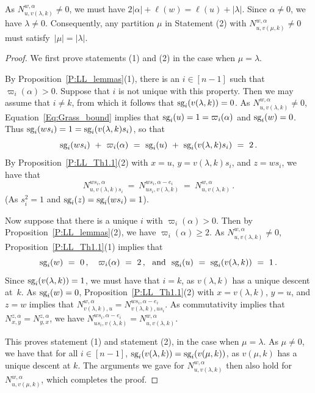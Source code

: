\documentclass[11pt]{article}
\theoremstyle{definition}
\numberwithin{equation}{section}
\newcommand{\sg}{{\mbox{\rm sg}}}
\begin{document}
As $N^{w,\alpha}_{u,v(\lambda,k)}\neq 0$, we must have $2|\alpha|+\ell(w)=\ell(u)+|\lambda|$.
Since $\alpha\neq 0$, we have $\lambda\neq 0$.
   Consequently, any partition $\mu$ in Statement (2) with $N^{w,\alpha}_{u,v(\mu,k)}\neq 0$ must satisfy~$|\mu|=|\lambda|$.

 \begin{proof}
   We first prove statements (1) and (2) in the case when $\mu=\lambda$.
   
   
   By Proposition~\ref{P:LL_lemmas}(1), there is an $i\in[n{-}1]$ such that $\varpi_i(\alpha)>0$.
   Suppose that $i$ is not unique with this property.
   Then we may assume that $i\neq k$, from which it follows that $\sg_i(v(\lambda, k)) = 0$.
   As $N^{w,\alpha}_{u,v(\lambda,k)}\neq 0$, Equation~\eqref{Eq:Grass_bound} implies that $\sg_i(u)=1=\varpi_i(\alpha)$ and $\sg_i(w)=0$.
   Thus $\sg_i(ws_i)=1=\sg_i(v(\lambda,k)s_i)$, so that
   \[
     \sg_i(ws_i)\ +\ \varpi_i(\alpha)\ =\ \sg_i(u)\ +\ \sg_i(v(\lambda,k) s_i)\ =\ 2\,.
   \]
   By Proposition~\ref{P:LL_Th1.1}(2) with $x=u$, $y=v(\lambda,k) s_i$, and $z=w s_i$, we have that 
   \[
     N^{ ws_i,\alpha}_{u, v(\lambda,k) s_i}\ =\ N^{ws_i, \alpha-e_i}_{u s_i, v(\lambda,k)}\ =\ N^{w,\alpha}_{u,v(\lambda,k)}\,.
   \]
   (As $s_i^2=1$ and $\sg_i(z)=\sg_i(ws_i)=1$).
   
   Now suppose that there is a unique $i$ with $\varpi_i(\alpha)>0$.
   Then by Proposition~\ref{P:LL_lemmas}(2), we have $\varpi_i(\alpha)\geq 2$.
   As $N^{w,\alpha}_{u,v(\lambda,k)}\neq  0$,  Proposition~\ref{P:LL_Th1.1}(1) implies that 
   \[
     \sg_i(w)\ =\ 0\,,\ \ \ 
     \varpi_i(\alpha)\ =\ 2\,,\ \ \mbox{and}\ \
     \sg_i(u)\ =\ \sg_i(v(\lambda,k))\ = \ 1\,.
   \]
   Since $\sg_i(v(\lambda,k))=1$, we must have that $i=k$, as $v(\lambda,k)$ has a unique descent at~$k$.
   As $\sg_i(w)=0$,  Proposition~\ref{P:LL_Th1.1}(2) with $x=v(\lambda,k)$, $y=u$, and $z=w$ implies that
   $N^{w,\alpha}_{v(\lambda,k), u}=N^{w s_i, \alpha-e_i}_{v(\lambda,k), u s_i}$.
   As commutativity implies that $N^{z,\alpha}_{x,y}=N^{z,\alpha}_{y,x}$, we have
   $N^{ws_i, \alpha-e_i}_{u s_i,v(\lambda,k)}=N^{w,\alpha}_{u,v(\lambda,k)}$.

   This proves statement (1) and statement (2), in the case when $\mu=\lambda$.
   As $\mu\neq 0$, we have that for all $i\in[n{-}1]$, $\sg_i(v(\lambda,k))=\sg_i(v(\mu,k))$, as
   $v(\mu,k)$ has a unique descent at $k$.
   The arguments we gave for $N^{w,\alpha}_{u,v(\lambda,k)}$ then also hold for $N^{w,\alpha}_{u,v(\mu,k)}$, which completes the proof.
 \end{proof}
\end{document}
